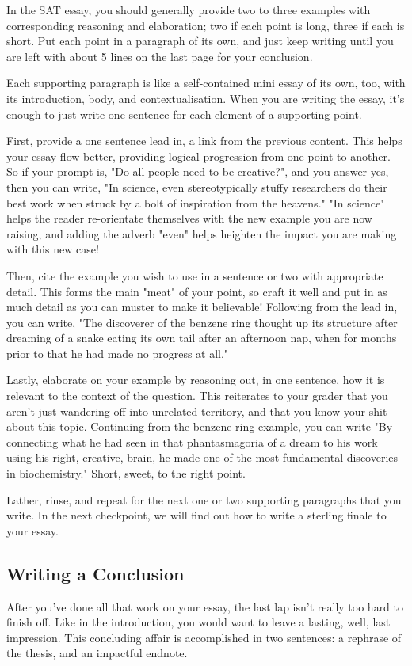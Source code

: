 In the SAT essay, you should generally provide two to three examples with corresponding reasoning and elaboration; two if each point is long, three if each is short. Put each point in a paragraph of its own, and just keep writing until you are left with about 5 lines on the last page for your conclusion.

Each supporting paragraph is like a self-contained mini essay of its own, too, with its introduction, body, and contextualisation. When you are writing the essay, it's enough to just write one sentence for each element of a supporting point.

First, provide a one sentence lead in, a link from the previous content. This helps your essay flow better, providing logical progression from one point to another. So if your prompt is, "Do all people need to be creative?", and you answer yes, then you can write, "In science, even stereotypically stuffy researchers do their best work when struck by a bolt of inspiration from the heavens." "In science" helps the reader re-orientate themselves with the new example you are now raising, and adding the adverb "even" helps heighten the impact you are making with this new case!

Then, cite the example you wish to use in a sentence or two with appropriate detail. This forms the main "meat" of your point, so craft it well and put in as much detail as you can muster to make it believable! Following from the lead in, you can write, "The discoverer of the benzene ring thought up its structure after dreaming of a snake eating its own tail after an afternoon nap, when for months prior to that he had made no progress at all."

Lastly, elaborate on your example by reasoning out, in one sentence, how it is relevant to the context of the question. This reiterates to your grader that you aren't just wandering off into unrelated territory, and that you know your shit about this topic. Continuing from the benzene ring example, you can write "By connecting what he had seen in that phantasmagoria of a dream to his work using his right, creative, brain, he made one of the most fundamental discoveries in biochemistry." Short, sweet, to the right point.

Lather, rinse, and repeat for the next one or two supporting paragraphs that you write. In the next checkpoint, we will find out how to write a sterling finale to your essay.
\subsection{Writing a Conclusion}
After you've done all that work on your essay, the last lap isn't really too hard to finish off. Like in the introduction, you would want to leave a lasting, well, last impression. This concluding affair is accomplished in two sentences: a rephrase of the thesis, and an impactful endnote.

